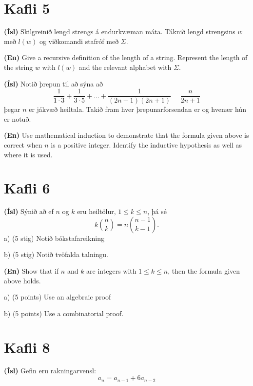 \documentclass[addpoints]{exam}
\begin{document}
\begin{questions}
\begin{multicols}{2}
\end{multicols}

\section{Kafli 5}

\question[10]
\textbf{(Ísl)} Skilgreinið lengd strengs á endurkvæman máta. Táknið lengd strengsins $w$ með $l(w)$ og viðkomandi stafróf með $\Sigma$.

\textbf{(En)} Give a recursive definition of the length of a string. Represent the length of the string $w$ with $l(w)$ and the relevant alphabet with $\Sigma$.

\question[10] 

\textbf{(Ísl)} Notið þrepun til að sýna að
\[
 \frac{1}{1\cdot 3} + \frac{1}{3\cdot 5} + \ldots + \frac{1}{(2n -1)(2n+1)} = \frac{n}{2n +1}
\]
þegar $n$ er jákvæð heiltala. Takið fram hver þrepunarforsendan er og hvenær hún er notuð. 

\textbf{(En)} Use mathematical induction to demonstrate that the formula given above is correct when $n$ is a positive integer. Identify the inductive hypothesis as well as where it is used.

\section{Kafli 6}

\question[10]
\textbf{(Ísl)} Sýnið að ef $n$ og $k$ eru heiltölur, $1 \leq k \leq n$, þá sé
\[
k\binom{n}{k} = n\binom{n-1}{k-1}.
\]
{a) (5 stig)} Notið bókstafareikning

{b) (5 stig)} Notið tvöfalda talningu.

\textbf{(En)} Show that if $n$ and $k$ are integers with $1 \leq k \leq n$, then the formula given above holds.

{a) (5 points)} Use an algebraic proof

{b) (5 points)} Use a combinatorial proof.

\section{Kafli 8}

\question 

\textbf{(Ísl)} Gefin eru rakningarvensl:
\[
 a_n = a_{n-1} + 6a_{n-2}
\]

\end{questions}
\end{document}
